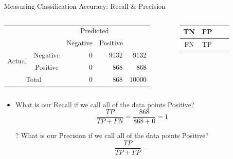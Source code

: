 \documentclass[aspectratio=169]{beamer}
\begin{document}
\begin{frame}{Measuring Classification Accuracy: Recall \& Precision}

\begin{columns}[c]
\begin{column}{0.7\textwidth}

\begin{tabular}{|c|c|r|r|r|} \hline
\multicolumn{2}{|c|}{}   &   \multicolumn{2}{c|}{Predicted}  & \\ \cline{3-4}
\multicolumn{2}{|c|}{} & Negative & Positive  & \\ \hline  
\multirow{2}{*}{Actual} & Negative & 0 & 9132  & 9132 \\ \cline{2-5}
 & Positive & 0 & 868  & 868 \\ \hline \hline
 \multicolumn{2}{|c|}{Total} & 0 & 868  & 10000\\ \hline
 \end{tabular}
\end{column}
\begin{column}{0.3\textwidth}

\begin{tabular}{|c|c|c|c|} \hline
TN & FP\\ \hline
FN & TP \\ \hline
 \end{tabular}
\end{column}
\end{columns}
\begin{itemize}
	\item What is our Recall if we call all of the data points Positive?
	$$\frac{TP}{TP + FN} = \frac{868}{868+0} = 1$$
	\item[?] What is our Precision if we call all of the data points Positive?
	$$\frac{TP}{TP+FP} = $$
\end{itemize}

	
\end{frame}
\end{document}
